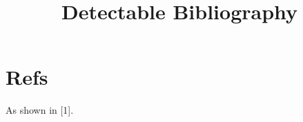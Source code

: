 \documentclass[letterpaper]{article}
\begin{document}
\title{Detectable Bibliography}\author{}\date{}\maketitle
\section{Refs}
As shown in [1].
\end{document}
